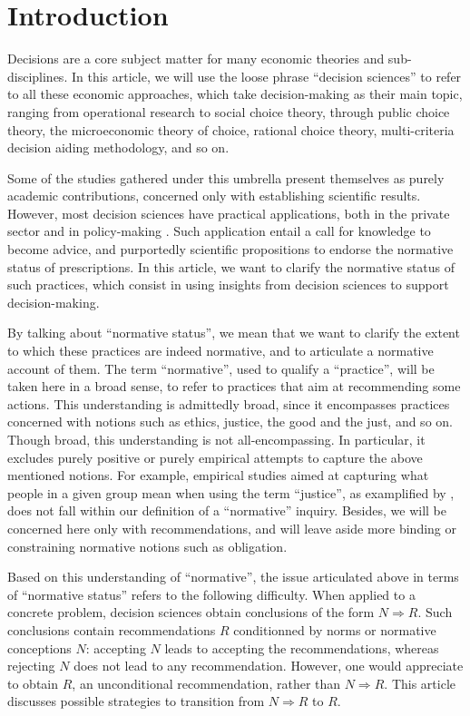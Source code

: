 \documentclass[preprint, french, english, 11pt, authoryear]{elsarticle}%
\begin{document}
\section{Introduction}
Decisions are a core subject matter for many economic theories and sub-disciplines. In this article, we will use the loose phrase ``decision sciences'' to refer to all these economic approaches, which take decision-making as their main topic, ranging from operational research to social choice theory, through public choice theory, the microeconomic theory of choice, rational choice theory, multi-criteria decision aiding methodology, and so on.

Some of the studies gathered under this umbrella present themselves as purely academic contributions, concerned only with establishing scientific results. However, most decision sciences have practical applications, both in the private sector and in policy-making \citet{tsoukias_policy_2013,marchi_evidence-based_2016}. Such application entail a call for knowledge to become advice, and purportedly scientific propositions to endorse the normative status of prescriptions. 
In this article, we want to clarify the normative status of such practices, which consist in using insights from decision sciences to support decision-making.

By talking about ``normative status'', we mean that we want to clarify the extent to which these practices are indeed normative, and to articulate a normative account of them. 
The term ``normative'', used to qualify a “practice”, will be taken here in a broad sense, to refer to practices that aim at recommending some actions. This understanding is admittedly broad, since it encompasses practices concerned with notions such as ethics, justice, the good and the just, and so on. 
Though broad, this understanding is not all-encompassing. In particular, it excludes purely positive or purely empirical attempts to capture the above mentioned notions. For example, empirical studies aimed at capturing what people in a given group mean when using the term ``justice'', as examplified by \citet{gaertner_empirical_2012}, does not fall within our definition of a ``normative'' inquiry. Besides, we will be concerned here only with recommendations, and will leave aside more binding or constraining normative notions such as obligation.

Based on this understanding of ``normative'', the issue articulated above in terms of ``normative status'' refers to the following difficulty. When applied to a concrete problem, decision sciences obtain conclusions of the form $N ⇒ R$. Such conclusions contain recommendations $R$ conditionned by norms or normative conceptions $N$: accepting  $N$ leads to accepting the recommendations, whereas rejecting $N$ does not lead to any recommendation. However, one would appreciate to obtain $R$, an unconditional recommendation, rather than $N ⇒ R$. This article discusses possible strategies to transition from $N ⇒ R$ to $R$.
\end{document}
